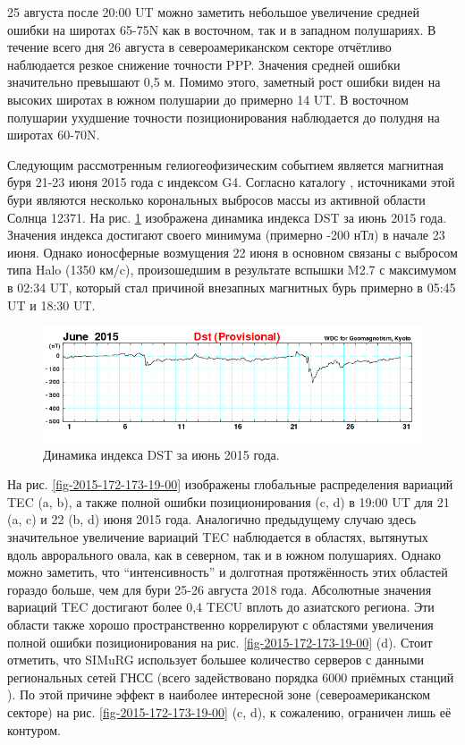 25 августа после 20:00 UT можно заметить небольшое увеличение средней ошибки на широтах 65-75\degree N как в восточном, так и в западном полушариях. 
В течение всего дня 26 августа в североамериканском секторе отчётливо наблюдается резкое снижение точности PPP.
Значения средней ошибки значительно превышают 0,5 м.
Помимо этого, заметный рост ошибки виден на высоких широтах в южном полушарии до примерно 14 UT.
В восточном полушарии ухудшение точности позиционирования наблюдается до полудня на широтах 60-70\degree N.

Следующим рассмотренным гелиогеофизическим событием является магнитная буря 21-23 июня 2015 года с индексом G4.
Согласно каталогу \cite{SOHO}, источниками этой бури являются несколько корональных выбросов массы из активной области Солнца 12371.
На рис. \ref{fig-dst1506} изображена динамика индекса DST за июнь 2015 года.
Значения индекса достигают своего минимума (примерно -200 нТл) в начале 23 июня.
Однако ионосферные возмущения 22 июня в основном связаны с выбросом типа Halo (1350 км/c), произошедшим в результате вспышки M2.7 с максимумом в 02:34 UT, который стал причиной внезапных магнитных бурь примерно в 05:45 UT и 18:30 UT.
\begin{figure}[h]
\includegraphics[width=\textwidth]{fig/dst1506.png}    
\caption{Динамика индекса DST за июнь 2015 года.}
\label{fig-dst1506}      
\end{figure} 

На рис. \ref{fig-2015-172-173-19-00} изображены глобальные распределения вариаций TEC (a, b), а также полной ошибки позиционирования (c, d) в 19:00 UT для 21 (a, c) и 22 (b, d) июня 2015 года. 
Аналогично предыдущему случаю здесь значительное увеличение вариаций TEC наблюдается в областях, вытянутых вдоль аврорального овала, как в северном, так и в южном полушариях. 
Однако можно заметить, что ``интенсивность'' и долготная протяжённость этих областей гораздо больше, чем для бури 25-26 августа 2018 года.
Абсолютные значения вариаций TEC достигают более 0,4 TECU вплоть до азиатского региона. 
Эти области также хорошо пространственно коррелируют с областями увеличения полной ошибки позиционирования на рис. \ref{fig-2015-172-173-19-00} (d). 
Стоит отметить, что SIMuRG использует большее количество серверов с данными региональных сетей ГНСС (всего задействовано порядка 6000 приёмных станций \cite{Yasyukevich2020}).
По этой причине эффект в наиболее интересной зоне (североамериканском секторе) на рис. \ref{fig-2015-172-173-19-00} (c, d), к сожалению, ограничен лишь её контуром.  

